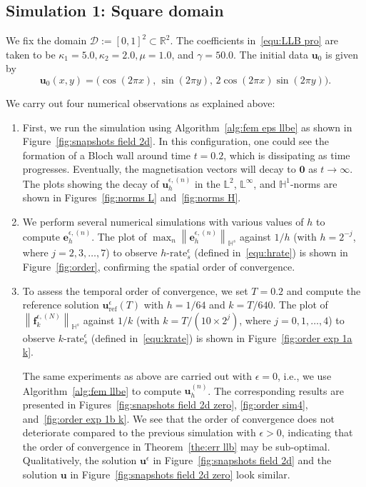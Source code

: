 \documentclass[11pt,reqno]{amsart}
\theoremstyle{definition}
\numberwithin{equation}{section}
\newcommand{\bff}{\boldsymbol}
\newcommand{\bb}{\mathbb}
\newcommand{\norm}[2]{\left\|{#1}\right\|_{#2}}
\begin{document}
\subsection{Simulation 1: Square domain}
We fix the domain $\mathscr{D}:= [0,1]^2\subset \bb{R}^2$. The coefficients in~\eqref{equ:LLB pro} are taken to be $\kappa_1=5.0, \kappa_2=2.0, \mu=1.0$, and $\gamma=50.0$. The initial data $\bff{u}_0$ is given by
\begin{equation*}
	\bff{u}_0(x,y)= \big(\cos(2\pi x),\, \sin(2\pi y),\, 2\cos(2\pi x) \sin(2\pi y) \big).
\end{equation*}

{
We carry out four numerical observations as explained above:

\begin{enumerate}
\item[(O1)] First, we run the simulation using Algorithm~\ref{alg:fem eps llbe} as shown in Figure~\ref{fig:snapshots field 2d}. In this configuration, one could see the formation of a Bloch wall around time $t=0.2$, which is dissipating as time progresses. Eventually, the magnetisation vectors will decay to $\bff{0}$ as $t\to\infty$. The plots showing the decay of $\bff{u}_h^{\epsilon,(n)}$ in the $\bb{L}^2$, $\bb{L}^\infty$, and $\bb{H}^1$-norms are shown in Figures~\ref{fig:norms L} and~\ref{fig:norms H}.

\item[(O2)] We perform several numerical simulations with various values of $h$ to compute $\bff{e}_h^{\epsilon, (n)}$. The plot of $\max_n \norm{\bff{e}_h^{\epsilon, (n)}}{\bb{H}^s}$ against $1/h$ (with $h=2^{-j}$, where $j=2,3,\ldots,7$) to observe $h\text{-rate}_s^\epsilon$ (defined in~\eqref{equ:hrate}) is shown in Figure~\ref{fig:order}, confirming the spatial order of convergence. 


\item[(O3)] To assess the temporal order of convergence, we set $T=0.2$ and compute the reference solution $\bff{u}^\epsilon_{\mathrm{ref}}(T)$ with $h=1/64$ and $k=T/640$. The plot of $\norm{\bff{f}_k^{\epsilon, (N)}}{\bb{H}^s}$ against $1/k$ (with $k=T/(10\times 2^j)$, where $j=0,1,\ldots,4$) to observe $k\text{-rate}_s^\epsilon$ (defined in~\eqref{equ:krate}) is shown in Figure~\ref{fig:order exp 1a k}.


The same experiments as above are carried out with $\epsilon=0$, i.e., we use Algorithm~\ref{alg:fem llbe} to compute $\bff{u}_h^{(n)}$. The corresponding results are presented in Figures~\ref{fig:snapshots field 2d zero}, \ref{fig:order sim4}, and~\ref{fig:order exp 1b k}. We see that the order of convergence does not deteriorate compared to the previous simulation with $\epsilon>0$, indicating that the order of convergence in Theorem~\ref{the:err llb} may be sub-optimal. Qualitatively, the solution $\bff{u}^\epsilon$ in Figure~\ref{fig:snapshots field 2d} and the solution $\bff{u}$ in Figure~\ref{fig:snapshots field 2d zero} look similar.




\end{enumerate}}
\end{document}
